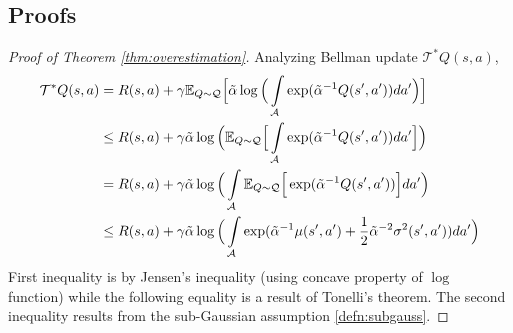 \documentclass{article}
\begin{document}
\newpage 

\begin{appendices}
	
	\section{Proofs}
	\label{app:proofs}
	
	\begin{proof}[Proof of Theorem \ref{thm:overestimation}]
		Analyzing Bellman update $\mathcal{T}^{*} Q(s,a)$, 
		\begin{align*}
			\mathcal{T}^{*} Q(s,a) &= R(s,a) + \gamma \mathbb{E}_{Q\sim \mathcal{Q}} \Big[ \Tilde{\alpha} \log \Big( \int\limits_{\mathcal{A}} \exp({\Tilde{\alpha}}^{-1} Q(s',a')) da' \Big) \Big] \\
			&\leq R(s,a) + \gamma \Tilde{\alpha} \log \Big( \mathbb{E}_{Q\sim \mathcal{Q}} \Big[ \int\limits_{\mathcal{A}} \exp({\Tilde{\alpha}}^{-1} Q(s',a')) da'  \Big] \Big) \\
			&= R(s,a) + \gamma \Tilde{\alpha} \log \Big( \int\limits_{\mathcal{A}} \mathbb{E}_{Q\sim \mathcal{Q}} \Big[ \exp({\Tilde{\alpha}}^{-1} Q(s',a')) \Big] da' \Big) \\
			&\leq R(s,a) + \gamma \Tilde{\alpha} \log \Big( \int\limits_{\mathcal{A}} \exp( {\Tilde{\alpha}}^{-1} \mu(s',a') + \frac{1}{2} {\Tilde{\alpha}}^{-2} \sigma^2(s',a') ) da' \Big) \\
		\end{align*}
		First inequality is by Jensen's inequality (using concave property of $\log$ function) while the following equality is a result of Tonelli's theorem. The second inequality results from the sub-Gaussian assumption \ref{defn:subgauss}. 
	\end{proof} 
	

\end{appendices}
\end{document}
